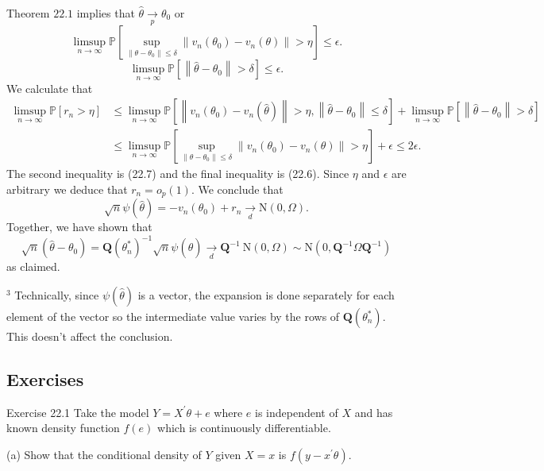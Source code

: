 \documentclass[10pt]{article}
\begin{document}
Theorem $22.1$ implies that $\widehat{\theta} \underset{p}{\rightarrow} \theta_{0}$ or
$$
\limsup _{n \rightarrow \infty} \mathbb{P}\left[\sup _{\left\|\theta-\theta_{0}\right\| \leq \delta}\left\|v_{n}\left(\theta_{0}\right)-v_{n}(\theta)\right\|>\eta\right] \leq \epsilon .
$$
$$
\limsup _{n \rightarrow \infty} \mathbb{P}\left[\left\|\widehat{\theta}-\theta_{0}\right\|>\delta\right] \leq \epsilon .
$$
We calculate that
$$
\begin{aligned}
\limsup _{n \rightarrow \infty} \mathbb{P}\left[r_{n}>\eta\right] & \leq \limsup _{n \rightarrow \infty} \mathbb{P}\left[\left\|v_{n}\left(\theta_{0}\right)-v_{n}(\widehat{\theta})\right\|>\eta,\left\|\widehat{\theta}-\theta_{0}\right\| \leq \delta\right]+\limsup _{n \rightarrow \infty} \mathbb{P}\left[\left\|\widehat{\theta}-\theta_{0}\right\|>\delta\right] \\
& \leq \limsup _{n \rightarrow \infty} \mathbb{P}\left[\sup _{\left\|\theta-\theta_{0}\right\| \leq \delta}\left\|v_{n}\left(\theta_{0}\right)-v_{n}(\theta)\right\|>\eta\right]+\epsilon \leq 2 \epsilon .
\end{aligned}
$$
The second inequality is (22.7) and the final inequality is (22.6). Since $\eta$ and $\epsilon$ are arbitrary we deduce that $r_{n}=o_{p}(1)$. We conclude that
$$
\sqrt{n} \psi(\widehat{\theta})=-v_{n}\left(\theta_{0}\right)+r_{n} \underset{d}{\longrightarrow} \mathrm{N}(0, \Omega) .
$$
Together, we have shown that
$$
\sqrt{n}\left(\widehat{\theta}-\theta_{0}\right)=\boldsymbol{Q}\left(\theta_{n}^{*}\right)^{-1} \sqrt{n} \psi(\widehat{\theta}) \underset{d}{\longrightarrow} \boldsymbol{Q}^{-1} \mathrm{~N}(0, \Omega) \sim \mathrm{N}\left(0, \boldsymbol{Q}^{-1} \Omega \boldsymbol{Q}^{-1}\right)
$$
as claimed.

${ }^{3}$ Technically, since $\psi(\widehat{\theta})$ is a vector, the expansion is done separately for each element of the vector so the intermediate value varies by the rows of $\boldsymbol{Q}\left(\theta_{n}^{*}\right)$. This doesn't affect the conclusion.

\subsection{Exercises}
Exercise 22.1 Take the model $Y=X^{\prime} \theta+e$ where $e$ is independent of $X$ and has known density function $f(e)$ which is continuously differentiable.

(a) Show that the conditional density of $Y$ given $X=x$ is $f\left(y-x^{\prime} \theta\right)$.
\end{document}

